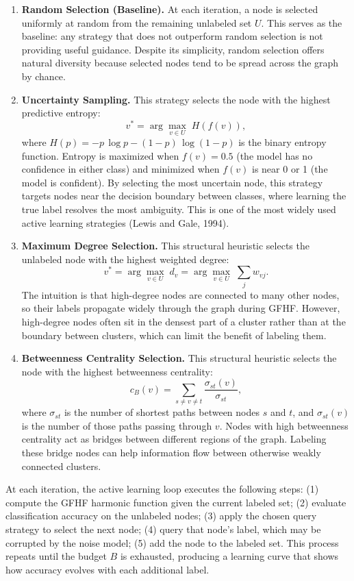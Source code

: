 \documentclass{article}
\begin{document}
\begin{enumerate}

\item \textbf{Random Selection (Baseline).}
At each iteration, a node is selected uniformly at random from the remaining unlabeled set $U$. This serves as the baseline: any strategy that does not outperform random selection is not providing useful guidance. Despite its simplicity, random selection offers natural diversity because selected nodes tend to be spread across the graph by chance.

\item \textbf{Uncertainty Sampling.}
This strategy selects the node with the highest predictive entropy:
\[
v^* = \arg\max_{v \in U}\; H(f(v)),
\]
where $H(p) = -p\,\log p - (1-p)\,\log(1-p)$ is the binary entropy function. Entropy is maximized when $f(v) = 0.5$ (the model has no confidence in either class) and minimized when $f(v)$ is near 0 or 1 (the model is confident). By selecting the most uncertain node, this strategy targets nodes near the decision boundary between classes, where learning the true label resolves the most ambiguity. This is one of the most widely used active learning strategies (Lewis and Gale, 1994).

\item \textbf{Maximum Degree Selection.}
This structural heuristic selects the unlabeled node with the highest weighted degree:
\[
v^* = \arg\max_{v \in U}\; d_v = \arg\max_{v \in U}\; \sum_j w_{vj}.
\]
The intuition is that high-degree nodes are connected to many other nodes, so their labels propagate widely through the graph during GFHF. However, high-degree nodes often sit in the densest part of a cluster rather than at the boundary between clusters, which can limit the benefit of labeling them.

\item \textbf{Betweenness Centrality Selection.}
This structural heuristic selects the node with the highest betweenness centrality:
\[
c_B(v) = \sum_{s \neq v \neq t} \frac{\sigma_{st}(v)}{\sigma_{st}},
\]
where $\sigma_{st}$ is the number of shortest paths between nodes $s$ and $t$, and $\sigma_{st}(v)$ is the number of those paths passing through $v$. Nodes with high betweenness centrality act as bridges between different regions of the graph. Labeling these bridge nodes can help information flow between otherwise weakly connected clusters.

\end{enumerate}

At each iteration, the active learning loop executes the following steps: (1) compute the GFHF harmonic function given the current labeled set; (2) evaluate classification accuracy on the unlabeled nodes; (3) apply the chosen query strategy to select the next node; (4) query that node's label, which may be corrupted by the noise model; (5) add the node to the labeled set. This process repeats until the budget $B$ is exhausted, producing a learning curve that shows how accuracy evolves with each additional label.
\end{document}
